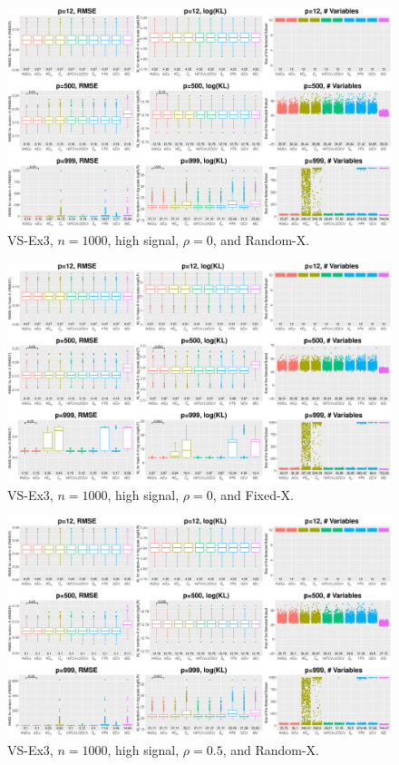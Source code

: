 \clearpage
\begin{figure}[!ht]
\centering
\includegraphics[width=\textwidth]{figures/supplement/randomx_VS-Ex3_n1000_hsnr_rho0.eps}
\caption{VS-Ex3, $n=1000$, high signal, $\rho=0$, and Random-X.}
\end{figure}
\begin{figure}[!ht]
\centering
\includegraphics[width=\textwidth]{figures/supplement/fixedx_VS-Ex3_n1000_hsnr_rho0.eps}
\caption{VS-Ex3, $n=1000$, high signal, $\rho=0$, and Fixed-X.}
\end{figure}
\clearpage
\begin{figure}[!ht]
\centering
\includegraphics[width=\textwidth]{figures/supplement/randomx_VS-Ex3_n1000_hsnr_rho05.eps}
\caption{VS-Ex3, $n=1000$, high signal, $\rho=0.5$, and Random-X.}
\end{figure}
